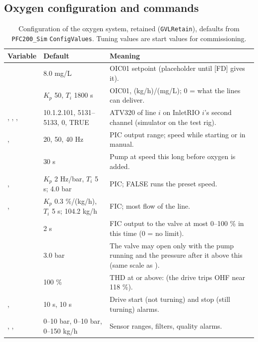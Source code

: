\documentclass[11pt]{article}
\begin{document}
\subsection*{Oxygen configuration and commands}

\begin{table}[htbp]
\centering\small
\caption{Configuration of the oxygen system, retained (\texttt{GVLRetain}), defaults from
\texttt{PFC200\_Sim} \texttt{ConfigValues}. Tuning values are start values for commissioning.}
\label{tab:oxyconfig}
\begin{tabularx}{\textwidth}{@{}P{62mm}P{36mm}L@{}}
\toprule
Variable & Default & Meaning \\
\midrule
{} & 8.0 mg/L & OIC01 setpoint (placeholder until [FD] gives it). \\
 & $K_p$ 50, $T_i$ 1800 s & OIC01, (kg/h)/(mg/L);  0 = what the lines can deliver. \\
, , ,  & 10.1.2.101, 5131--5133, 0, TRUE & ATV320 of line $i$ on InletRIO $i$'s second channel (simulator on the test rig). \\
,  & 20, 50, 40 Hz & PIC output range; speed while starting or in manual. \\
 & 30 s & Pump at speed this long before oxygen is added. \\
,  & $K_p$ 2 Hz/bar, $T_i$ 5 s; 4.0 bar & PIC;  FALSE runs the preset speed. \\
,  & $K_p$ 0.3 \%/(kg/h), $T_i$ 5 s; 104.2 kg/h & FIC; most flow of the line. \\
 & 2 s & FIC output to the valve at most 0--100 \% in this time (0 = no limit). \\
 & 3.0 bar & The valve may open only with the pump running and the pressure after it above this (same scale as ). \\
 & 100 \% & THD at or above:  (the drive trips OHF near 118 \%). \\
,  & 10 s, 10 s & Drive start (not turning) and stop (still turning) alarms. \\
, ,  & 0--10 bar, 0--10 bar, 0--150 kg/h & Sensor ranges, filters, quality alarms. \\
\bottomrule
\end{tabularx}
\end{table}
\end{document}
